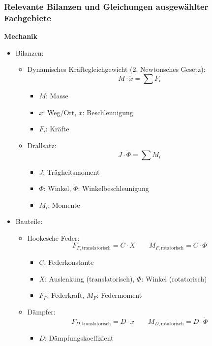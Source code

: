 \documentclass[12pt]{article}
\begin{document}
\subsubsection*{Relevante Bilanzen und Gleichungen ausgewählter Fachgebiete}
\textbf{Mechanik}
\begin{itemize}
    \item Bilanzen:
    \begin{itemize}
        \item Dynamisches Kräftegleichgewicht (2. Newtonsches Gesetz):
        \[
        M\cdot \ddot{x} = \sum F_i
        \]
        \begin{itemize}
            \item \(M\): Masse
            \item \(x\): Weg/Ort, \(\ddot{x}\): Beschleunigung
            \item \(F_i\): Kräfte
        \end{itemize}
        \item Drallsatz:
        \[
        J\cdot \ddot{\Phi} = \sum M_i
        \]
        \begin{itemize}
            \item \(J\): Trägheitsmoment
            \item \(\Phi\): Winkel, \(\ddot{\Phi}\): Winkelbeschleunigung
            \item \(M_i\): Momente
        \end{itemize}
    \end{itemize}
    \item Bauteile:
    \begin{itemize}
        \item Hookesche Feder:
        \[
        F_{F,\text{translatorisch}} = C\cdot X
        \qquad
        M_{F,\text{rotatorisch}} = C\cdot \Phi
        \]
        \begin{itemize}
            \item \(C\): Federkonstante
            \item \(X\): Auslenkung (translatorisch), \(\Phi\): Winkel (rotatorisch)
            \item \(F_F\): Federkraft, \(M_F\): Federmoment
        \end{itemize}
        \item Dämpfer:
        \[
        F_{D,\text{translatorisch}} = D\cdot \dot{x}
        \qquad
        M_{D,\text{rotatorisch}} = D\cdot \dot{\Phi}
        \]
        \begin{itemize}
            \item \(D\): Dämpfungskoeffizient

\end{itemize}
\end{itemize}
\end{itemize}
\end{document}
